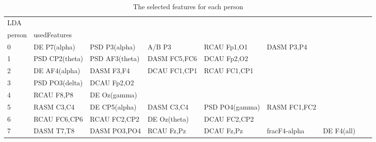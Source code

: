 \clearpage
\begin{landscape}
\begin{table}[]
\centering
\caption{The selected features for each person}
\begin{tabular}{l|llllllll}
LDA                &                      &                         &                      &                    &                       &                      &                 &                 \\
person             & usedFeatures         &                         &                      &                    &                       &                      &                 &                 \\
0                  & DE P7(alpha)         & PSD P3(alpha)           & A/B P3               & RCAU Fp1,O1        & DASM P3,P4            &                      &                 &                 \\
1                  & PSD CP2(theta)       & PSD AF3(theta)          & DASM FC5,FC6         & DCAU Fp2,O2        &                       &                      &                 &                 \\
2                  & DE AF4(alpha)        & DASM F3,F4              & DCAU FC1,CP1         & RCAU FC1,CP1       &                       &                      &                 &                 \\
3                  & PSD PO3(delta)       & DCAU Fp2,O2             &                      &                    &                       &                      &                 &                 \\
4                  & RCAU F8,P8           & DE Oz(gamma)            &                      &                    &                       &                      &                 &                 \\
5                  & RASM C3,C4           & DE CP5(alpha)           & DASM C3,C4           & PSD PO4(gamma)     & RASM FC1,FC2          &                      &                 &                 \\
6                  & RCAU FC6,CP6         & RCAU FC2,CP2            & DE Oz(theta)         & DCAU FC2,CP2       &                       &                      &                 &                 \\
7                  & DASM T7,T8           & DASM PO3,PO4            & RCAU Fz,Pz           & DCAU Fz,Pz         & fracF4-alpha          & DE F4(all)           &                 &                 \\

\end{tabular}
\end{table}
\end{landscape}
